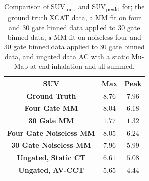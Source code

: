             \begin{table}
                
                \centering
                
                \captionsetup{singlelinecheck=false, justification=centering}
                \caption{
                Comparison of \gls{SUV}\textsubscript{max} and \gls{SUV}\textsubscript{peak}, for; the ground truth \gls{XCAT} data, a \gls{MM} fit on four and $30$ gate binned data applied to $30$ gate binned data, a \gls{MM} fit on noiseless four and $30$ gate binned data applied to $30$ gate binned data, and ungated data \gls{AC} with a static \gls{Mu-Map} at end inhalation and all  summed.}
                
                
                \resizebox*{1.0\linewidth}{!}
                {
                    \begin{tabular}{||c|cc||}
                        \hline
                        \textbf{SUV}                            & \textbf{Max}  & \textbf{Peak} \\
                        \hline
                        \textbf{Ground Truth}                   & $8.76$        & $7.96$ \\
                        \hline
                        \textbf{Four Gate MM}                   & $8.04$        & $6.18$ \\
                        \textbf{30 Gate MM}                     & $1.77$        & $1.32$ \\
                        \hline
                        \textbf{Four Gate Noiseless \gls{MM}}   & $8.05$        & $6.24$ \\
                        \textbf{30 Gate Noiseless \gls{MM}}     & $7.96$        & $5.99$ \\
                        \hline
                        \textbf{Ungated, Static CT}             & $6.61$        & $5.08$ \\
                        \textbf{Ungated, AV-CCT}                & $5.65$        & $4.44$ \\
                        \hline
                    \end{tabular}
                }
                \label{tab:suv}
                
            \end{table}
            

